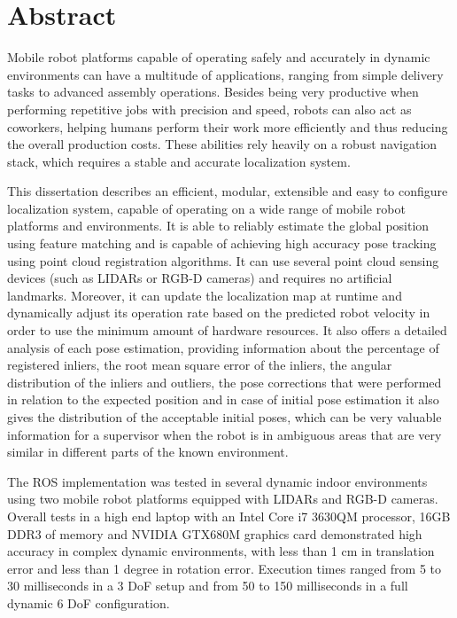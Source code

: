 \chapter*{Abstract}

Mobile robot platforms capable of operating safely and accurately in dynamic environments can have a multitude of applications, ranging from simple delivery tasks to advanced assembly operations. Besides being very productive when performing repetitive jobs with precision and speed, robots can also act as coworkers, helping humans perform their work more efficiently and thus reducing the overall production costs. These abilities rely heavily on a robust navigation stack, which requires a stable and accurate localization system.

This dissertation describes an efficient, modular, extensible and easy to configure localization system, capable of operating on a wide range of mobile robot platforms and environments. It is able to reliably estimate the global position using feature matching and is capable of achieving high accuracy pose tracking using point cloud registration algorithms. It can use several point cloud sensing devices (such as LIDARs or RGB-D cameras) and requires no artificial landmarks. Moreover, it can update the localization map at runtime and dynamically adjust its operation rate based on the predicted robot velocity in order to use the minimum amount of hardware resources. It also offers a detailed analysis of each pose estimation, providing information about the percentage of registered inliers, the root mean square error of the inliers, the angular distribution of the inliers and outliers, the pose corrections that were performed in relation to the expected position and in case of initial pose estimation it also gives the distribution of the acceptable initial poses, which can be very valuable information for a supervisor when the robot is in ambiguous areas that are very similar in different parts of the known environment.

The ROS implementation was tested in several dynamic indoor environments using two mobile robot platforms equipped with LIDARs and RGB-D cameras. Overall tests in a high end laptop with an Intel Core i7 3630QM processor, 16GB DDR3 of memory and NVIDIA GTX680M graphics card demonstrated high accuracy in complex dynamic environments, with less than 1 cm in translation error and less than 1 degree in rotation error. Execution times ranged from 5 to 30 milliseconds in a 3 DoF setup and from 50 to 150 milliseconds in a full dynamic 6 DoF configuration.



